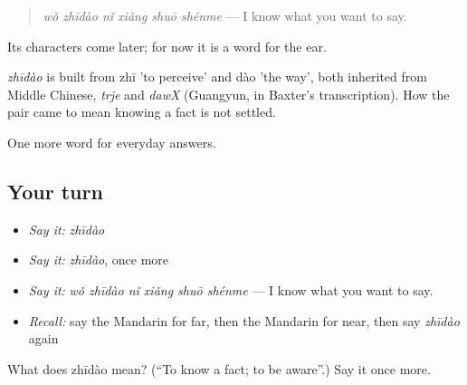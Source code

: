 \begin{quote}
\emph{wǒ zhīdào nǐ xiǎng shuō shénme} — I know what you want to say.
\end{quote}

Its characters come later; for now it is a word for the ear.

\begin{cousinweb}
\emph{zhīdào} is built from zhī 'to perceive' and dào 'the way', both inherited from Middle Chinese, \emph{trje} and \emph{dawX} (Guangyun, in Baxter's transcription). How the pair came to mean knowing a fact is not settled.
\end{cousinweb}

\begin{grammarlens}[title={What you've built}]
One more word for everyday answers.
\end{grammarlens}

\subsection*{Your turn}
\begin{itemize}
\raggedright
  \item \emph{Say it:} \emph{zhīdào}
  \item \emph{Say it:} \emph{zhīdào}, once more
  \item \emph{Say it:} \emph{wǒ zhīdào nǐ xiǎng shuō shénme} — I know what you want to say.
  \item \emph{Recall:} say the Mandarin for far, then the Mandarin for near, then say \emph{zhīdào} again
\end{itemize}

\begin{tcolorbox}[breakable,colback=teal!4,colframe=teal!35!black,title={Before you move on}]
What does zhīdào mean? (\textquotedblleft{}To know a fact; to be aware\textquotedblright{}.) Say it once more.
\end{tcolorbox}
